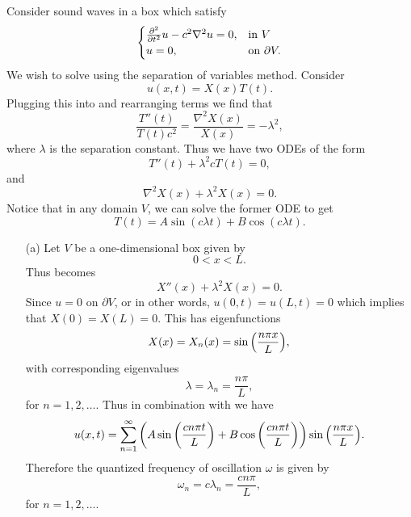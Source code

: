 \documentclass[12pt]{report}
\begin{document}
\begin{solution}

    \noindent
    Consider sound waves in a box which satisfy
    \begin{equation}\label{2}
        \begin{cases}
            \frac{\partial^{2} }{\partial t^{2}}u - c^2\nabla^2u = 0, &\text{in} ~ V\\
            u = 0, &\text{on} ~ \partial V.
        \end{cases}
    \end{equation}
    We wish to solve  using the separation of variables method. Consider
    \[
        u(x,t) = X(x)T(t).
    \] 
    Plugging this into  and rearranging terms we find that
    \[
        \frac{T''(t)}{T(t)c^2} = \frac{\nabla^2 X(x)}{X(x)} = - \lambda^2, 
    \]
    where $\lambda$ is the separation constant. Thus we have two ODEs of the form
    \[
        T''(t) + \lambda^2 c T(t) = 0,
    \] 
    and 
    \begin{equation} \label{2-x}
        \nabla^2 X(x) + \lambda^2 X(x) = 0.
    \end{equation}
    Notice that in any domain $V$, we can solve the former ODE to get 
    \begin{equation} \label{2-t-sol}
        T(t) = A\sin(c \lambda t) + B\cos(c \lambda t).
    \end{equation}

    \begin{enumerate}
        \item [(a)]
        Let $V$ be a one-dimensional box given by 
        \[
            0 < x < L.
        \]    
        Thus  becomes
        \[
            X''(x) + \lambda^2 X(x) = 0.
        \]
        Since $u = 0$ on $\partial V$, or in other words, $u(0,t) = u(L,t) = 0$ which implies that $X(0) = X(L) = 0.$  This has eigenfunctions
        \[
            X(x) = X_n(x) = \sin{\left(\frac{n\pi x}{L}\right)},
        \]
        with corresponding eigenvalues
        \[
            \lambda = \lambda_n = \frac{n \pi}{L},
        \]
        for $n=1,2,\dots$. Thus in combination with  we have
        \[
            u(x,t) = \sum_{n=1}^\infty {\left(A\sin{\left(\frac{c n \pi t}{L}\right)} + B\cos{\left(\frac{c n \pi t}{L}\right)}\right)}\sin{\left(\frac{n\pi x}{L}\right)}.
        \]
        Therefore the quantized frequency of oscillation $\omega$ is given by
        \[
            \omega_n = c \lambda_n = \frac{c n \pi}{L},
        \]
        for $n=1,2,\dots$.


\end{enumerate}
\end{solution}
\end{document}
